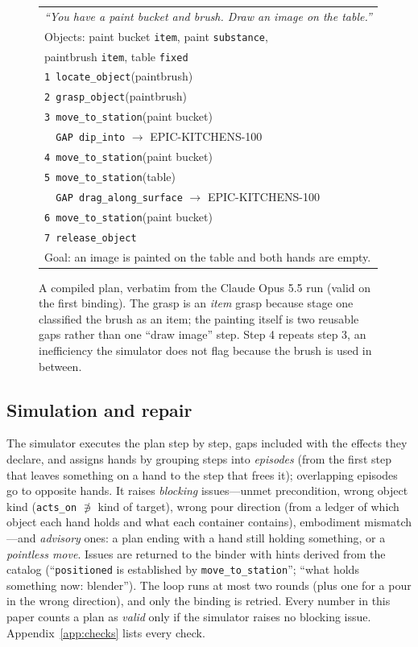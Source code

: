 \documentclass[10pt,twocolumn,letterpaper]{article}
\newcommand{\code}[1]{\texttt{\small #1}}
\begin{document}
\begin{figure}[t]
\small
\begin{tabular}{@{}l@{}}
\toprule
\emph{``You have a paint bucket and brush. Draw an image on the table.''}\\
Objects: paint bucket \code{item}, paint \code{substance},\\
\hspace{3.6em}paintbrush \code{item}, table \code{fixed}\\
\midrule
\code{1 locate\_object}(paintbrush)\\
\code{2 grasp\_object}(paintbrush)\\
\code{3 move\_to\_station}(paint bucket)\\
\textcolor{red!70!black}{\code{\ \ GAP dip\_into}} $\to$ EPIC-KITCHENS-100\\
\code{4 move\_to\_station}(paint bucket)\\
\code{5 move\_to\_station}(table)\\
\textcolor{red!70!black}{\code{\ \ GAP drag\_along\_surface}} $\to$ EPIC-KITCHENS-100\\
\code{6 move\_to\_station}(paint bucket)\\
\code{7 release\_object}\\
\midrule
Goal: an image is painted on the table and both hands are empty.\\
\bottomrule
\end{tabular}
\caption{A compiled plan, verbatim from the Claude Opus 5.5 run (valid on the first binding). The grasp is an
\emph{item} grasp because stage one classified the brush as an item; the painting itself is two reusable gaps rather
than one ``draw image'' step. Step 4 repeats step 3, an inefficiency the simulator does not flag because the brush is
used in between.}
\label{fig:plan}
\end{figure}

\subsection{Simulation and repair}\label{sec:sim}
The simulator executes the plan step by step, gaps included with the effects they declare, and assigns hands by
grouping steps into \emph{episodes} (from the first step that leaves something on a hand to the step that frees it);
overlapping episodes go to opposite hands. It raises \emph{blocking} issues---unmet precondition, wrong object kind
(\code{acts\_on} $\not\ni$ kind of target), wrong pour direction (from a ledger of which object each hand holds and
what each container contains), embodiment mismatch---and \emph{advisory} ones: a plan ending with a hand still holding
something, or a \emph{pointless move}. Issues are returned to the binder with hints derived from the catalog
(``\code{positioned} is established by \code{move\_to\_station}''; ``what holds something now: blender''). The loop
runs at most two rounds (plus one for a pour in the wrong direction), and only the binding is retried. Every number
in this paper counts a plan as \emph{valid} only if the simulator raises no blocking issue. Appendix~\ref{app:checks}
lists every check.
\end{document}
